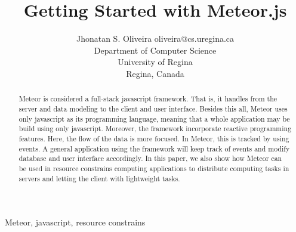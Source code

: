 \documentclass[twoside,11pt]{article}
\newcommand{\thistitle}{{Getting Started with Meteor.js}}
\begin{document}
\title{\thistitle}

\author{\name Jhonatan S. Oliveira \email oliveira@cs.uregina.ca \\
\addr Department of Computer Science \\
University of Regina \\ 
Regina, Canada
}


\maketitle

\begin{abstract}%
Meteor is considered a full-stack javascript framework.
That is, it handles from the server and data modeling to the client and user interface.
Besides this all, Meteor uses only javascript as its programming language, meaning that a whole application may be build using only javascript.
Moreover, the framework incorporate reactive programming features.
Here, the flow of the data is more focused.
In Meteor, this is tracked by using events.
A general application using the framework will keep track of events and modify database and user interface accordingly.
In this paper, we also show how Meteor can be used in resource constrains computing applications to distribute computing tasks in servers and letting the client with lightweight tasks.
\end{abstract}

\begin{keywords}
Meteor, javascript, resource constrains
\end{keywords}







\vskip 0.2in

\end{document}
